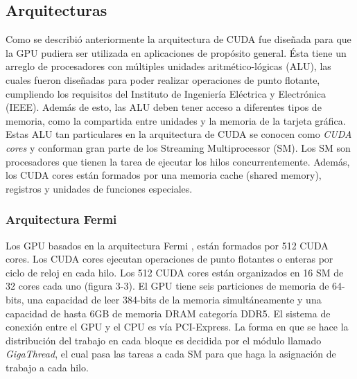 \subsection{Arquitecturas}
Como se describió anteriormente la arquitectura de CUDA fue diseñada para que la GPU pudiera ser utilizada en aplicaciones de propósito general. Ésta tiene un arreglo de procesadores con múltiples unidades aritmético-lógicas (ALU), las cuales fueron diseñadas para poder realizar operaciones de punto flotante, cumpliendo los requisitos del Instituto de Ingeniería Eléctrica y Electrónica (IEEE). Además de esto, las ALU deben tener acceso a diferentes tipos de memoria, como la compartida entre unidades y la memoria de la tarjeta gráfica.\\
Estas ALU tan particulares en la arquitectura de CUDA se conocen como \textit{CUDA cores} y conforman gran parte de los Streaming Multiprocessor (SM). Los SM son procesadores que tienen la tarea de ejecutar los hilos concurrentemente. Además, los CUDA cores están formados por una memoria cache (shared memory), registros y unidades de funciones especiales.
\subsubsection{Arquitectura Fermi}
Los GPU basados en la arquitectura Fermi \cite{fermi}, están formados por 512 CUDA cores. Los CUDA cores ejecutan operaciones de punto flotantes o enteras por ciclo de reloj en cada hilo. Los 512 CUDA cores están organizados en 16 SM de 32 cores cada uno (figura 3-3). El GPU tiene seis particiones de memoria de 64-bits, una capacidad de leer 384-bits de la memoria simultáneamente y una capacidad de hasta 6GB de memoria DRAM categoría DDR5. El sistema de conexión entre el GPU y el CPU es vía PCI-Express. La forma en que se hace la distribución del trabajo en cada bloque es decidida por el módulo llamado \textit{GigaThread}, el cual pasa las tareas a cada SM para que  haga la asignación de trabajo a cada hilo.\\

